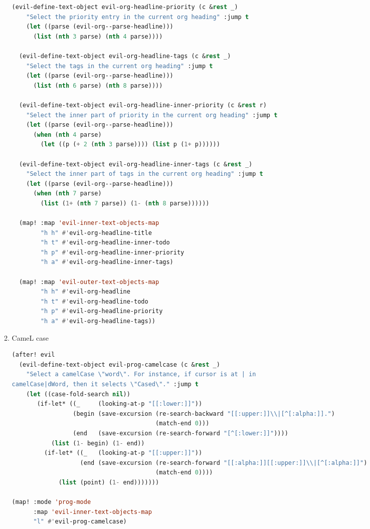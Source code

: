 \documentclass[11pt]{article}
\begin{document}
\begin{enumerate}
\begin{enumerate}
\begin{lstlisting}[language=Lisp]
  (evil-define-text-object evil-org-headline-priority (c &rest _)
    "Select the priority entry in the current org heading" :jump t
    (let ((parse (evil-org--parse-headline)))
      (list (nth 3 parse) (nth 4 parse))))
  
  (evil-define-text-object evil-org-headline-tags (c &rest _)
    "Select the tags in the current org heading" :jump t
    (let ((parse (evil-org--parse-headline)))
      (list (nth 6 parse) (nth 8 parse))))
  
  (evil-define-text-object evil-org-headline-inner-priority (c &rest r)
    "Select the inner part of priority in the current org heading" :jump t
    (let ((parse (evil-org--parse-headline)))
      (when (nth 4 parse)
        (let ((p (+ 2 (nth 3 parse)))) (list p (1+ p))))))
  
  (evil-define-text-object evil-org-headline-inner-tags (c &rest _)
    "Select the inner part of tags in the current org heading" :jump t
    (let ((parse (evil-org--parse-headline)))
      (when (nth 7 parse)
        (list (1+ (nth 7 parse)) (1- (nth 8 parse))))))
  
  (map! :map 'evil-inner-text-objects-map
        "h h" #'evil-org-headline-title
        "h t" #'evil-org-headline-inner-todo
        "h p" #'evil-org-headline-inner-priority
        "h a" #'evil-org-headline-inner-tags)
  
  (map! :map 'evil-outer-text-objects-map
        "h h" #'evil-org-headline
        "h t" #'evil-org-headline-todo
        "h p" #'evil-org-headline-priority
        "h a" #'evil-org-headline-tags))
\end{lstlisting}
  \item CameL case
  \label{sec:camel-case}

  \begin{lstlisting}[language=Lisp]
(after! evil
  (evil-define-text-object evil-prog-camelcase (c &rest _)
    "Select a camelCase \"word\". For instance, if cursor is at | in
camelCase|dWord, then it selects \"Cased\"." :jump t
    (let ((case-fold-search nil))
       (if-let* ((_     (looking-at-p "[[:lower:]]"))
                 (begin (save-excursion (re-search-backward "[[:upper:]]\\|[^[:alpha:]].")
                                        (match-end 0)))
                 (end   (save-excursion (re-search-forward "[^[:lower:]]"))))
           (list (1- begin) (1- end))
         (if-let* ((_   (looking-at-p "[[:upper:]]"))
                   (end (save-excursion (re-search-forward "[[:alpha:]][[:upper:]]\\|[^[:alpha:]]")
                                        (match-end 0))))
             (list (point) (1- end)))))))

(map! :mode 'prog-mode
      :map 'evil-inner-text-objects-map
      "l" #'evil-prog-camelcase)
\end{lstlisting}
\end{enumerate}

\end{enumerate}
\end{document}
